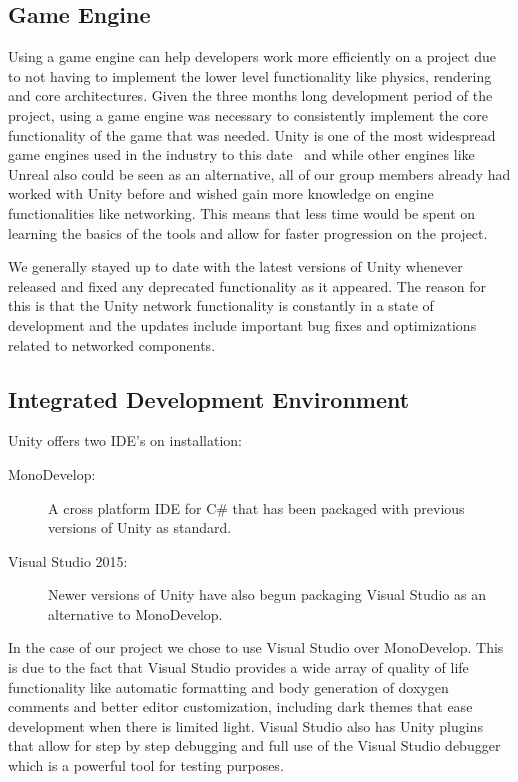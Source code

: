 \subsection{Game Engine}
Using a game engine can help developers work more efficiently on a project due to not having to implement the lower level functionality like physics, rendering and core architectures. Given the three months long development period of the project, using a game engine was necessary to consistently implement the core functionality of the game that was needed. Unity is one of the most widespread game engines used in the industry to this date~\cite{unityUsageStatistics} and while other engines like Unreal also could be seen as an alternative, all of our group members already had worked with Unity before and wished gain more knowledge on engine functionalities like networking. This means that less time would be spent on learning the basics of the tools and allow for faster progression on the project.

We generally stayed up to date with the latest versions of Unity whenever released and fixed any deprecated functionality as it appeared. The reason for this is that the Unity network functionality is constantly in a state of development and the updates include important bug fixes and optimizations related to networked components. 
    
\subsection{Integrated Development Environment}
Unity offers two IDE's on installation:
\begin{description}
    \item[MonoDevelop: ] A cross platform IDE for C\# that has been packaged with previous versions of Unity as standard. 
    \item[Visual Studio 2015: ] Newer versions of Unity have also begun packaging Visual Studio as an alternative to MonoDevelop. 
\end{description}

In the case of our project we chose to use Visual Studio over MonoDevelop. This is due to the fact that Visual Studio provides a wide array of quality of life functionality like automatic formatting and body generation of doxygen comments and better editor customization, including dark themes that ease development when there is limited light. 
Visual Studio also has Unity plugins that allow for step by step debugging and full use of the Visual Studio debugger which is a powerful tool for testing purposes. 

